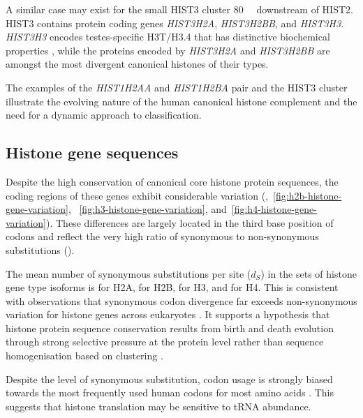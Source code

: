     A similar case may exist for the small HIST3 cluster \SI{80}{\mega\bp} downstream of HIST2.
    HIST3 contains protein coding genes \textit{HIST3H2A}, \textit{HIST3H2BB}, and \textit{HIST3H3}.
    \textit{HIST3H3} encodes testes-specific H3T/H3.4
    that has distinctive biochemical properties \citep{WittExpCellRes1996,KurumizakaCOSB2013},
    while the proteins encoded by \textit{HIST3H2A} and \textit{HIST3H2BB}
    are amongst the most divergent canonical histones of their types.

    The examples of the \textit{HIST1H2AA} and \textit{HIST1H2BA} pair
    and the HIST3 cluster illustrate
    the evolving nature of the human canonical histone complement
    and the need for a dynamic approach to classification.

  \subsection{Histone gene sequences}
    Despite the high conservation of canonical core histone protein sequences,
    the coding regions of these genes exhibit considerable variation
    (,~\ref{fig:h2b-histone-gene-variation},
    ~\ref{fig:h3-histone-gene-variation}, and~\ref{fig:h4-histone-gene-variation}).
    These differences are largely located in the third base position of codons
    and reflect the very high ratio of synonymous to non-synonymous
    substitutions ().

    The mean number of synonymous substitutions per site ($d_S$)
    in the sets of histone gene type isoforms is
     \result{} for H2A,
     \result{} for H2B,
     \result{} for H3,
    and  \result{} for H4.
    This is consistent with observations that
    synonymous codon divergence far exceeds non-synonymous variation
    for histone genes across eukaryotes \citep{Piontkivska2002, Rooney2002}.
    It supports a hypothesis that histone protein sequence conservation
    results from birth and death evolution through strong selective pressure
    at the protein level rather than
    sequence homogenisation based on clustering \citep{NeiRooney2005}.

    Despite the level of synonymous substitution,
    codon usage is strongly biased towards the most frequently used
    human codons for most amino acids .
    This suggests that histone translation may be sensitive to tRNA abundance.

